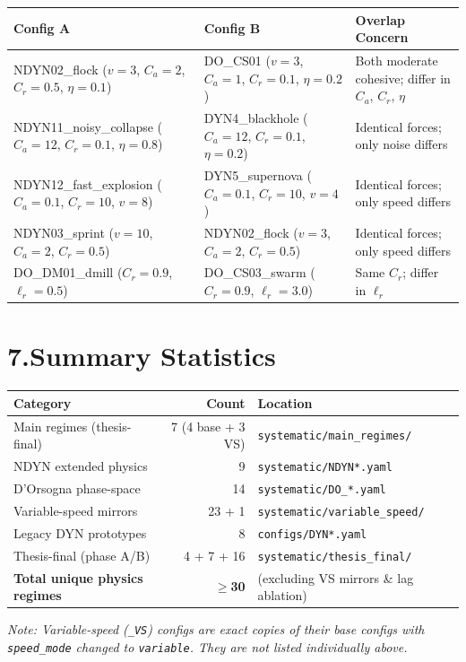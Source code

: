 \documentclass[10pt,landscape]{article}
\begin{document}
\begin{center}
\small
\begin{tabular}{l l l}
\toprule
\textbf{Config A} & \textbf{Config B} & \textbf{Overlap Concern} \\
\midrule
\rowcolor{dup}
NDYN02\_flock ($v{=}3$, $C_a{=}2$, $C_r{=}0.5$, $\eta{=}0.1$)
  & DO\_CS01 ($v{=}3$, $C_a{=}1$, $C_r{=}0.1$, $\eta{=}0.2$)
  & Both moderate cohesive; differ in $C_a$, $C_r$, $\eta$ \\
\rowcolor{dup}
NDYN11\_noisy\_collapse ($C_a{=}12$, $C_r{=}0.1$, $\eta{=}0.8$)
  & DYN4\_blackhole ($C_a{=}12$, $C_r{=}0.1$, $\eta{=}0.2$)
  & Identical forces; only noise differs \\
\rowcolor{dup}
NDYN12\_fast\_explosion ($C_a{=}0.1$, $C_r{=}10$, $v{=}8$)
  & DYN5\_supernova ($C_a{=}0.1$, $C_r{=}10$, $v{=}4$)
  & Identical forces; only speed differs \\
\rowcolor{dup}
NDYN03\_sprint ($v{=}10$, $C_a{=}2$, $C_r{=}0.5$)
  & NDYN02\_flock ($v{=}3$, $C_a{=}2$, $C_r{=}0.5$)
  & Identical forces; only speed differs \\
\rowcolor{dup}
DO\_DM01\_dmill ($C_r{=}0.9$, $\ell_r{=}0.5$)
  & DO\_CS03\_swarm ($C_r{=}0.9$, $\ell_r{=}3.0$)
  & Same $C_r$; differ in $\ell_r$ \\
\bottomrule
\end{tabular}
\end{center}

\section*{7.\quad Summary Statistics}

\begin{center}
\begin{tabular}{l r l}
\toprule
\textbf{Category} & \textbf{Count} & \textbf{Location} \\
\midrule
Main regimes (thesis-final)  & 7 (4 base + 3 VS) & \texttt{systematic/main\_regimes/} \\
NDYN extended physics        & 9                  & \texttt{systematic/NDYN*.yaml} \\
D'Orsogna phase-space        & 14                 & \texttt{systematic/DO\_*.yaml} \\
Variable-speed mirrors       & 23 + 1             & \texttt{systematic/variable\_speed/} \\
Legacy DYN prototypes        & 8                  & \texttt{configs/DYN*.yaml} \\
Thesis-final (phase A/B)     & 4 + 7 + 16         & \texttt{systematic/thesis\_final/} \\
\midrule
\textbf{Total unique physics regimes} & \textbf{$\ge$30} & (excluding VS mirrors \& lag ablation) \\
\bottomrule
\end{tabular}
\end{center}

\vfill
\noindent\textit{Note: Variable-speed (\texttt{\_VS}) configs are exact copies of their base configs
with \texttt{speed\_mode} changed to \texttt{variable}.  They are not listed individually above.}
\end{document}
